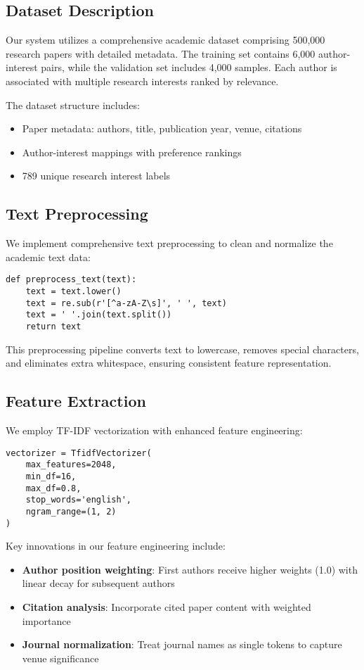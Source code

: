 \documentclass[preprint,12pt]{elsarticle}
\begin{document}
\subsection{Dataset Description}
Our system utilizes a comprehensive academic dataset comprising 500,000 research papers with detailed metadata. The training set contains 6,000 author-interest pairs, while the validation set includes 4,000 samples. Each author is associated with multiple research interests ranked by relevance.

The dataset structure includes:
\begin{itemize}
    \item Paper metadata: authors, title, publication year, venue, citations
    \item Author-interest mappings with preference rankings
    \item 789 unique research interest labels
\end{itemize}

\subsection{Text Preprocessing}
We implement comprehensive text preprocessing to clean and normalize the academic text data:

\begin{verbatim}
def preprocess_text(text):
    text = text.lower()
    text = re.sub(r'[^a-zA-Z\s]', ' ', text)
    text = ' '.join(text.split())
    return text
\end{verbatim}

This preprocessing pipeline converts text to lowercase, removes special characters, and eliminates extra whitespace, ensuring consistent feature representation.

\subsection{Feature Extraction}
We employ TF-IDF vectorization with enhanced feature engineering:

\begin{verbatim}
vectorizer = TfidfVectorizer(
    max_features=2048,
    min_df=16,
    max_df=0.8,
    stop_words='english',
    ngram_range=(1, 2)
)
\end{verbatim}

Key innovations in our feature engineering include:
\begin{itemize}
    \item \textbf{Author position weighting}: First authors receive higher weights (1.0) with linear decay for subsequent authors
    \item \textbf{Citation analysis}: Incorporate cited paper content with weighted importance
    \item \textbf{Journal normalization}: Treat journal names as single tokens to capture venue significance
\end{itemize}
\end{document}
